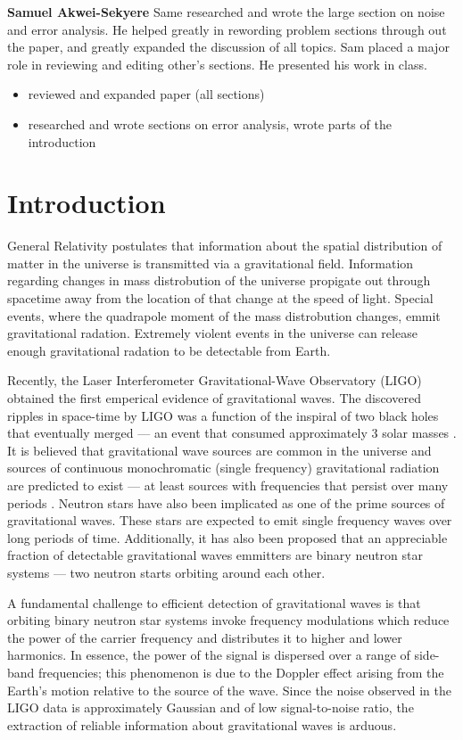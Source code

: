 \documentclass[onecolumn, groupedaddress, 10pt]{revtex4-1}
\begin{document}
\textbf{Samuel Akwei-Sekyere}
Same researched and wrote the large section on noise and error analysis. He helped greatly in rewording problem sections through out the paper, and greatly expanded the discussion of all topics. Sam placed a major role in reviewing and editing other's sections. He presented his work in class.
\begin{itemize}
\item reviewed and expanded paper (all sections)
\item researched and wrote sections on error analysis, wrote parts of the introduction
\end{itemize}

\pagebreak


\section{Introduction}
General Relativity postulates that information about the spatial distribution of matter in the universe is transmitted via a gravitational field.  Information regarding changes in mass distrobution of the universe propigate out through spacetime away from the location of that change at the speed of light.  Special events, where the quadrapole moment of the mass distrobution changes, emmit gravitational radation.  Extremely violent events in the universe can release enough gravitational radation to be detectable from Earth.

Recently, the Laser Interferometer Gravitational-Wave Observatory (LIGO) obtained the first emperical evidence of gravitational waves. The discovered ripples in space-time by LIGO was a function of the inspiral of two black holes that eventually merged --- an event that consumed approximately 3 solar masses \citep{abbott}.  It is believed that gravitational wave sources are common in the universe and sources of continuous monochromatic (single frequency) gravitational radiation are predicted to exist --- at least sources with frequencies that persist over many periods \cite{}. Neutron stars have also been implicated as one of the prime sources of gravitational waves.  These stars are expected to emit single frequency waves over long periods of time.  Additionally, it has also been proposed that an appreciable fraction of detectable gravitational waves emmitters are binary neutron star systems --- two neutron starts orbiting around each other.

A fundamental challenge to efficient detection of gravitational waves is that orbiting binary neutron star systems invoke frequency modulations which reduce the power of the carrier frequency and distributes it to higher and lower harmonics.  In essence, the power of the signal is dispersed over a range of side-band frequencies; this phenomenon is due to the Doppler effect arising from the Earth's motion relative to the source of the wave. Since the noise observed in the LIGO data is approximately Gaussian and of low signal-to-noise ratio, the extraction of reliable information about gravitational waves is arduous.
\end{document}
